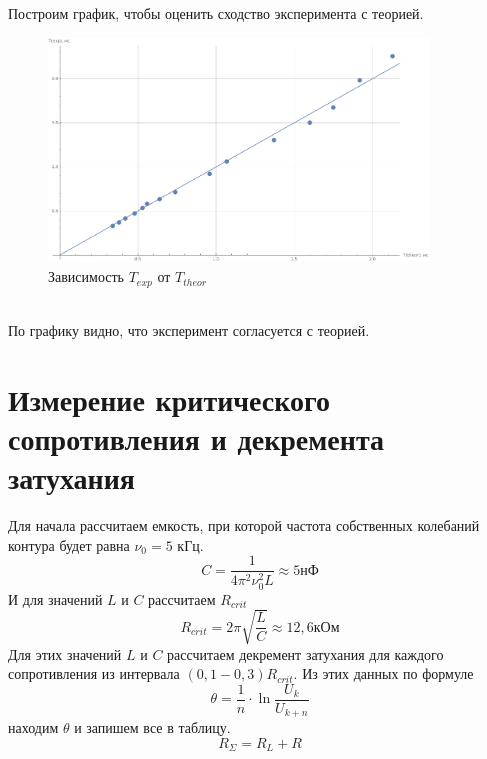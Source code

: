 \documentclass[a4paper,12pt]{article} %
\begin{document}
Построим график, чтобы оценить сходство эксперимента с теорией.\\
\begin{figure}[h!]
\begin{center}
\includegraphics[width = 0.9\textwidth]{2.png}
\caption{Зависимость $T_{exp}$ от $T_{theor}$}
\end{center}
\end{figure}\\
По графику видно, что эксперимент согласуется с теорией.
\newpage
\section*{Измерение критического сопротивления и декремента затухания}
Для начала рассчитаем емкость, при которой частота собственных колебаний контура будет равна $\nu_0 = 5$ кГц.
\[C = \dfrac{1}{4 \pi^2 \nu_0^2 L} \approx 5 \text{нФ}\]
И для значений $L$ и $C$ рассчитаем $R_{crit}$
\[R_{crit} = 2\pi\sqrt{\dfrac{L}{C}} \approx 12,6 \text{кОм}\]
Для этих значений $L$ и $C$ рассчитаем декремент затухания для каждого сопротивления из интервала $(0,1-0,3)R_{crit}$. Из этих данных по формуле 
\[\theta = \frac{1}{n}\cdot\ln\frac{U_k}{U_{k+n}}\]
находим $\theta$ и запишем все в таблицу.
\[R_{\Sigma} = R_L + R\]
\\
 
\end{document}
